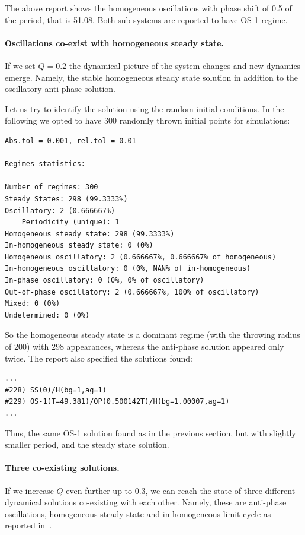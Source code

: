 \documentclass[11pt,a4paper]{article}
\begin{document}
The above report shows the homogeneous oscillations with phase shift of 0.5 of the
period, that is 51.08. Both sub-systems are reported to have OS-1 regime.

\paragraph{Oscillations co-exist with homogeneous steady state.}
\label{sec:oscill-co-exist}

If we set $Q=0.2$ the dynamical picture of the system changes and new dynamics
emerge. Namely, the stable homogeneous steady state solution in addition to the
oscillatory anti-phase solution.

Let us try to identify the solution using the random initial conditions. In the
following we opted to have 300 randomly thrown initial points for simulations:
\begin{verbatim}
Abs.tol = 0.001, rel.tol = 0.01
-------------------
Regimes statistics:
-------------------
Number of regimes: 300
Steady States: 298 (99.3333%)
Oscillatory: 2 (0.666667%)
	Periodicity (unique): 1
Homogeneous steady state: 298 (99.3333%)
In-homogeneous steady state: 0 (0%)
Homogeneous oscillatory: 2 (0.666667%, 0.666667% of homogeneous)
In-homogeneous oscillatory: 0 (0%, NAN% of in-homogeneous)
In-phase oscillatory: 0 (0%, 0% of oscillatory)
Out-of-phase oscillatory: 2 (0.666667%, 100% of oscillatory)
Mixed: 0 (0%)
Undetermined: 0 (0%)
\end{verbatim}

So the homogeneous steady state is a dominant regime (with the throwing radius of
200) with 298 appearances, whereas the anti-phase solution appeared only twice. The
report also specified the solutions found:
\begin{verbatim}
...
#228) SS(0)/H(bg=1,ag=1)
#229) OS-1(T=49.381)/OP(0.500142T)/H(bg=1.00007,ag=1)
...
\end{verbatim}

Thus, the same OS-1 solution found as in the previous section, but with slightly
smaller period, and the steady state solution.

\paragraph{Three co-existing solutions.}
\label{sec:three-co-existing}

If we increase $Q$ even further up to $0.3$, we can reach the state of three
different dynamical solutions co-existing with each other. Namely, these are
anti-phase oscillations, homogeneous steady state and in-homogeneous limit cycle as
reported in~\cite{Ullner2008}.
\end{document}
